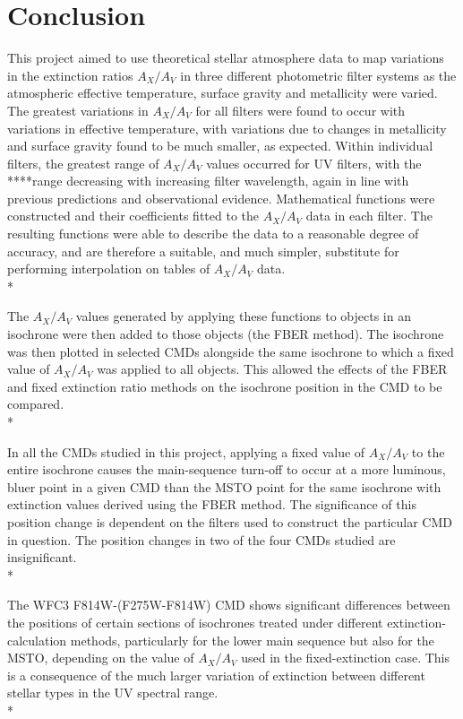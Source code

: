 \documentclass[12pt, a4paper]{report}
\begin{document}
\chapter{Conclusion}

This project aimed to use theoretical stellar atmosphere data to map variations in the extinction ratios $A_{X}/A_{V}$ in three different photometric filter systems as the atmospheric effective temperature, surface gravity and metallicity were varied. The greatest variations in $A_{X}/A_{V}$ for all filters were found to occur with variations in effective temperature, with variations due to changes in metallicity and surface gravity found to be much smaller, as expected. Within individual filters, the greatest range of $A_{X}/A_{V}$ values occurred for UV filters, with the ****range decreasing with increasing filter wavelength, again in line with previous predictions and observational evidence. Mathematical functions were constructed and their coefficients fitted to the $A_{X}/A_{V}$ data in each filter. The resulting functions were able to describe the data to a reasonable degree of accuracy, and are therefore a suitable, and much simpler, substitute for performing interpolation on tables of $A_{X}/A_{V}$ data. \\* 

The $A_{X}/A_{V}$ values generated by applying these functions to objects in an isochrone were then added to those objects (the FBER method). The isochrone was then plotted in selected CMDs alongside the same isochrone to which a fixed value of $A_{X}/A_{V}$ was applied to all objects. This allowed the effects of the FBER and fixed extinction ratio methods on the isochrone position in the CMD to be compared. \\*

In all the CMDs studied in this project, applying a fixed value of $A_{X}/A_{V}$ to the entire isochrone causes the main-sequence turn-off to occur at a more luminous, bluer point in a given CMD than the MSTO point for the same isochrone with extinction values derived using the FBER method. The significance of this position change is dependent on the filters used to construct the particular CMD in question. The position changes in two of the four CMDs studied are insignificant.\\*

The WFC3 F814W-(F275W-F814W) CMD shows significant differences between the positions of certain sections of isochrones treated under different extinction-calculation methods, particularly for the lower main sequence but also for the MSTO, depending on the value of $A_{X}/A_{V}$ used in the fixed-extinction case. This is a consequence of the much larger variation of extinction between different stellar types in the UV spectral range.\\*
\end{document}
